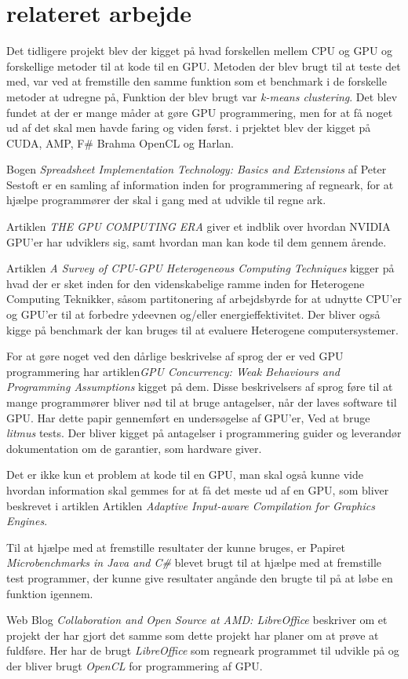 \section{relateret arbejde}
Det tidligere projekt \cite{P9} blev der kigget på hvad forskellen mellem CPU og GPU og forskellige metoder til at kode til en GPU. Metoden der blev brugt til at teste det med, var ved at fremstille den samme funktion som et benchmark i de forskelle metoder at udregne på, Funktion der blev brugt var \textit{k-means clustering}. Det blev fundet at der er mange måder at gøre GPU programmering, men for at få noget ud af det skal men havde faring og viden først. i prjektet blev der kigget på CUDA, AMP, F\# Brahma OpenCL og Harlan. 

Bogen \textit{Spreadsheet Implementation Technology: Basics and Extensions}\cite{Spreadsheet_Implementation_Technology} af Peter Sestoft er en samling af information inden for programmering af regneark, for at hjælpe programmører der skal i gang med at udvikle til regne ark.

Artiklen \textit{THE GPU COMPUTING ERA}\cite{nickolls2010gpu} giver et indblik over hvordan NVIDIA GPU'er har udviklers sig, samt hvordan man kan kode til dem gennem årende.

Artiklen \textit{A Survey of CPU-GPU Heterogeneous Computing Techniques}\cite{mittalsurvey} kigger på hvad der er sket inden for den videnskabelige ramme inden for Heterogene Computing Teknikker, såsom partitonering af arbejdsbyrde for at udnytte CPU'er og GPU'er til at forbedre ydeevnen og/eller energieffektivitet. Der bliver også kigge på benchmark der kan bruges til at evaluere Heterogene computersystemer.

For at gøre noget ved den dårlige beskrivelse af sprog der er ved GPU programmering har artiklen\textit{GPU Concurrency: Weak Behaviours and Programming Assumptions}\cite{alglave2015gpu} kigget på dem. Disse beskrivelsers af sprog føre til at mange programmører bliver nød til at bruge antagelser, når der laves software til GPU. Har dette papir gennemført en undersøgelse af GPU'er, Ved at bruge \textit{litmus} tests. Der bliver kigget på antagelser i programmering guider og leverandør dokumentation om de garantier, som hardware giver.

Det er ikke kun et problem at kode til en GPU, man skal også kunne vide hvordan information skal gemmes for at få det meste ud af en GPU, som bliver beskrevet i artiklen Artiklen \textit{Adaptive Input-aware Compilation for Graphics Engines}\cite{samadi2012adaptive}.

Til at hjælpe med at fremstille resultater der kunne bruges, er Papiret \textit{Microbenchmarks in Java and C\#}\cite{Microbenchmarks} blevet brugt til at hjælpe med at fremstille test programmer, der kunne give resultater angånde den brugte til på at løbe en funktion igennem.

Web Blog \textit{Collaboration and Open Source at AMD: LibreOffice} \cite{AMD_LibreOffice} beskriver om et projekt der har gjort det samme som dette projekt har planer om at prøve at fuldføre. Her har de brugt \textit{LibreOffice} som regneark programmet til udvikle på og der bliver brugt \textit{OpenCL} for programmering af GPU.



